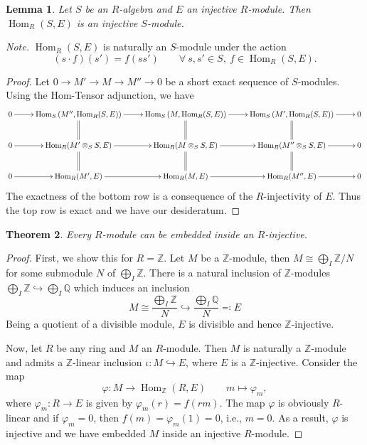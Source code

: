 \documentclass[10pt]{article}
\theoremstyle{thmstyle}
\newtheorem{theorem}{Theorem}[section]
\newtheorem{lemma}[theorem]{Lemma}
\theoremstyle{defstyle}
\newcommand{\Q}{\mathbb{Q}}
\newcommand{\Z}{\mathbb{Z}}
\newcommand{\Hom}{\operatorname{Hom}}
\newcommand{\into}{\hookrightarrow}
\begin{document}
\begin{lemma}
    Let $S$ be an $R$-algebra and $E$ an injective $R$-module. Then $\Hom_R(S, E)$ is an injective $S$-module.
\end{lemma}
\noindent\emph{Note.} $\Hom_R(S, E)$ is naturally an $S$-module under the action 
\begin{equation*}
    (s\cdot f)(s') = f(ss') \qquad\forall~s, s'\in S,~f\in\Hom_R(S, E).
\end{equation*}
\begin{proof}
    Let $0\to M'\to M\to M''\to 0$ be a short exact sequence of $S$-modules. Using the Hom-Tensor adjunction, we have 
    \begin{equation*}
        \xymatrix {
            0\ar[r] & \Hom_S\left(M'',\Hom_R(S, E)\right)\ar[r]\ar@{=}[d] & \Hom_S\left(M,\Hom_R(S, E)\right)\ar[r]\ar@{=}[d] & \Hom_S\left(M', \Hom_R(S, E)\right)\ar[r]\ar@{=}[d] & 0\\
            0\ar[r] & \Hom_R(M'\otimes_S S, E)\ar@{=}[d]\ar[r] & \Hom_R(M\otimes_S S, E)\ar@{=}[d]\ar[r] & \Hom_R(M''\otimes_S S, E)\ar@{=}[d]\ar[r] & 0\\
            0\ar[r] & \Hom_R(M', E)\ar[r] & \Hom_R(M, E)\ar[r] & \Hom_R(M'', E)\ar[r] & 0
        }
    \end{equation*}
    The exactness of the bottom row is a consequence of the $R$-injectivity of $E$. Thus the top row is exact and we have our desideratum.
\end{proof}

\begin{theorem}
    Every $R$-module can be embedded inside an $R$-injective.
\end{theorem}
\begin{proof}
    First, we show this for $R = \Z$. Let $M$ be a $\Z$-module, then $M\cong \bigoplus_I \Z/N$ for some submodule $N$ of $\bigoplus_I \Z$. There is a natural inclusion of $\Z$-modules $\bigoplus_I\Z\into\bigoplus_I\Q$ which induces an inclusion
    \begin{equation*}
        M\cong\frac{\bigoplus_I\Z}{N}\into \frac{\bigoplus_I\Q}{N}\eqcolon E
    \end{equation*}
    Being a quotient of a divisible module, $E$ is divisible and hence $\Z$-injective. 

    Now, let $R$ be any ring and $M$ an $R$-module. Then $M$ is naturally a $\Z$-module and admits a $\Z$-linear inclusion $\iota: M\into E$, where $E$ is a $\Z$-injective. Consider the map 
    \begin{equation*}
        \varphi: M\longrightarrow\Hom_{\Z}(R, E)\qquad m\longmapsto\varphi_m,
    \end{equation*}
    where $\varphi_m: R\to E$ is given by $\varphi_m(r) = f(rm)$. The map $\varphi$ is obviously $R$-linear and if $\varphi_m = 0$, then $f(m) = \varphi_m(1) = 0$, i.e., $m = 0$. As a result, $\varphi$ is injective and we have embedded $M$ inside an injective $R$-module.
\end{proof}
\end{document}
